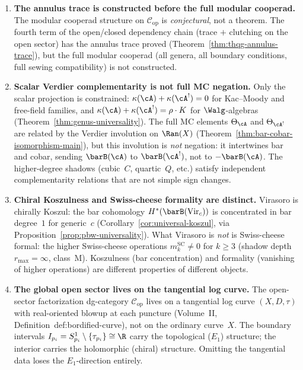 \begin{enumerate}
\item \textbf{The annulus trace is constructed before the full modular
 cooperad.}
 The modular cooperad structure on
 $\mathcal{C}_{\mathrm{op}}$ is
 \emph{conjectural}, not a theorem.
 The fourth term of the open/closed dependency chain
 (trace $+$ clutching on the open sector)
 has the annulus trace proved
 (Theorem~\ref{thm:thqg-annulus-trace}),
 but the full modular cooperad (all genera,
 all boundary conditions, full sewing compatibility)
 is not constructed.

\item \textbf{Scalar Verdier complementarity is not full MC
 negation.}
 Only the scalar projection is constrained:
 $\kappa(\cA) + \kappa(\cA^!) = 0$
 for Kac--Moody and free-field families,
 and $\kappa(\cA) + \kappa(\cA^!) = \rho \cdot K$
 for $\Walg$-algebras
 (Theorem~\ref{thm:genus-universality}).
 The full MC elements $\Theta_\cA$ and
 $\Theta_{\cA^!}$ are related by the
 Verdier involution on $\Ran(X)$
 (Theorem~\ref{thm:bar-cobar-isomorphism-main}),
 but this involution is \emph{not} negation:
 it intertwines bar and cobar, sending
 $\barB(\cA)$ to $\barB(\cA^!)$, not to
 $-\barB(\cA)$.
 The higher-degree shadows
 (cubic~$C$, quartic~$Q$, etc.)
 satisfy independent complementarity relations
 that are not simple sign changes.

\item \textbf{Chiral Koszulness and Swiss-cheese formality are
 distinct.}
 Virasoro is chirally Koszul: the bar cohomology
 $H^*(\barB(\mathrm{Vir}_c))$ is concentrated
 in bar degree~$1$ for generic~$c$
 (Corollary~\ref{cor:universal-koszul},
 via Proposition~\ref{prop:pbw-universality}).
 What Virasoro is \emph{not} is Swiss-cheese formal:
 the higher Swiss-cheese operations
 $m_k^{\mathrm{SC}} \neq 0$ for $k \geq 3$
 (shadow depth $r_{\max} = \infty$, class~M).
 Koszulness (bar concentration) and formality
 (vanishing of higher operations) are
 different properties of different objects.

\item \textbf{The global open sector lives on the tangential log
 curve.}
 The open-sector factorization dg-category
 $\mathcal{C}_{\mathrm{op}}$ lives on a tangential
 log curve $(X, D, \tau)$ with real-oriented blowup
 at each puncture
 (Volume~II, Definition~\textup{def:bordified-curve}),
 not on the ordinary curve~$X$. The boundary
 intervals $I_{p_i} = S^1_{p_i} \setminus
 \{\tau_{p_i}\} \cong \R$ carry the topological
 ($E_1$) structure; the interior carries the
 holomorphic (chiral) structure. Omitting the
 tangential data loses the $E_1$-direction entirely.


\end{enumerate}
